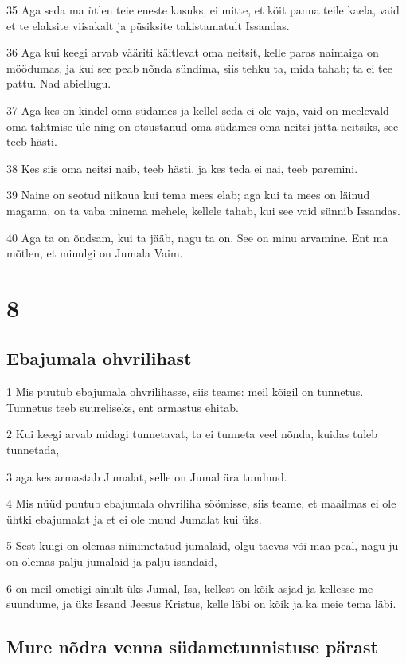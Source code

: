 \par 35 Aga seda ma ütlen teie eneste kasuks, ei mitte, et köit panna teile kaela, vaid et te elaksite viisakalt ja püsiksite takistamatult Issandas.
\par 36 Aga kui keegi arvab vääriti käitlevat oma neitsit, kelle paras naimaiga on möödumas, ja kui see peab nõnda sündima, siis tehku ta, mida tahab; ta ei tee pattu. Nad abiellugu.
\par 37 Aga kes on kindel oma südames ja kellel seda ei ole vaja, vaid on meelevald oma tahtmise üle ning on otsustanud oma südames oma neitsi jätta neitsiks, see teeb hästi.
\par 38 Kes siis oma neitsi naib, teeb hästi, ja kes teda ei nai, teeb paremini.
\par 39 Naine on seotud niikaua kui tema mees elab; aga kui ta mees on läinud magama, on ta vaba minema mehele, kellele tahab, kui see vaid sünnib Issandas.
\par 40 Aga ta on õndsam, kui ta jääb, nagu ta on. See on minu arvamine. Ent ma mõtlen, et minulgi on Jumala Vaim.


\chapter{8}

\section*{Ebajumala ohvrilihast}

\par 1 Mis puutub ebajumala ohvrilihasse, siis teame: meil kõigil on tunnetus. Tunnetus teeb suureliseks, ent armastus ehitab.
\par 2 Kui keegi arvab midagi tunnetavat, ta ei tunneta veel nõnda, kuidas tuleb tunnetada,
\par 3 aga kes armastab Jumalat, selle on Jumal ära tundnud.
\par 4 Mis nüüd puutub ebajumala ohvriliha söömisse, siis teame, et maailmas ei ole ühtki ebajumalat ja et ei ole muud Jumalat kui üks.
\par 5 Sest kuigi on olemas niinimetatud jumalaid, olgu taevas või maa peal, nagu ju on olemas palju jumalaid ja palju isandaid,
\par 6 on meil ometigi ainult üks Jumal, Isa, kellest on kõik asjad ja kellesse me suundume, ja üks Issand Jeesus Kristus, kelle läbi on kõik ja ka meie tema läbi.

\section*{Mure nõdra venna südametunnistuse pärast}

